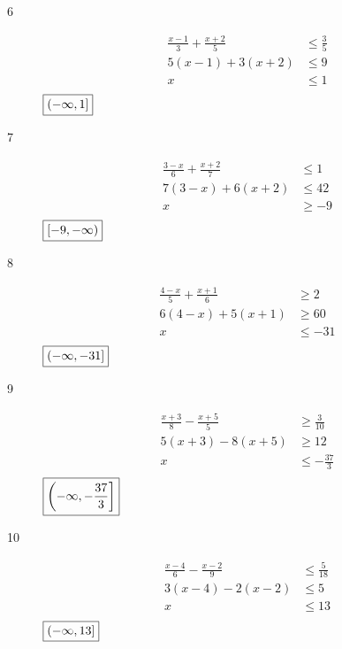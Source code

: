 \documentclass[letterpaper]{exam}
\begin{document}
\begin{description}
      \item[6]
        \begin{align*}
          \frac{x-1}{3} + \frac{x+2}{5} & \leq \frac{3}{5} \\
          5 (x - 1) + 3(x + 2)          & \leq 9 \\
          x                             & \leq 1 \\
        \end{align*}
        $\boxed{ \intoc{ -\infty, 1 } }$

      \item[7]
        \begin{align*}
          \frac{3 - x}{6} + \frac{x + 2}{7} & \leq 1 \\
          7 (3 - x) + 6(x + 2)              & \leq 42 \\
          x                                 & \geq -9 \\
        \end{align*}
        $\boxed{ \intco{ -9, -\infty } }$

      \item[8]
        \begin{align*}
          \frac{4 - x}{5} + \frac{x + 1}{6} & \geq 2 \\
          6 (4 - x) + 5(x + 1)              & \geq 60 \\
          x                                 & \leq -31 \\
        \end{align*}
        $\boxed{ \intoc{ -\infty, -31 } }$

      \item[9]
        \begin{align*}
          \frac{x + 3}{8} - \frac{x + 5}{5} & \geq \frac{3}{10} \\
          5(x + 3) - 8(x + 5)               & \geq 12 \\
          x                                 & \leq - \frac{37}{3} \\
        \end{align*}
        $\boxed{ \intoc{ -\infty, - \frac{37}{3} } }$

      \newpage

      \item[10]
        \begin{align*}
          \frac{x - 4}{6} - \frac{x - 2}{9} & \leq \frac{5}{18} \\
          3(x - 4) - 2(x - 2)               & \leq 5 \\
          x                                 & \leq 13 \\
        \end{align*}
        $\boxed{ \intoc{ -\infty, 13 } }$


\end{description}
\end{document}
